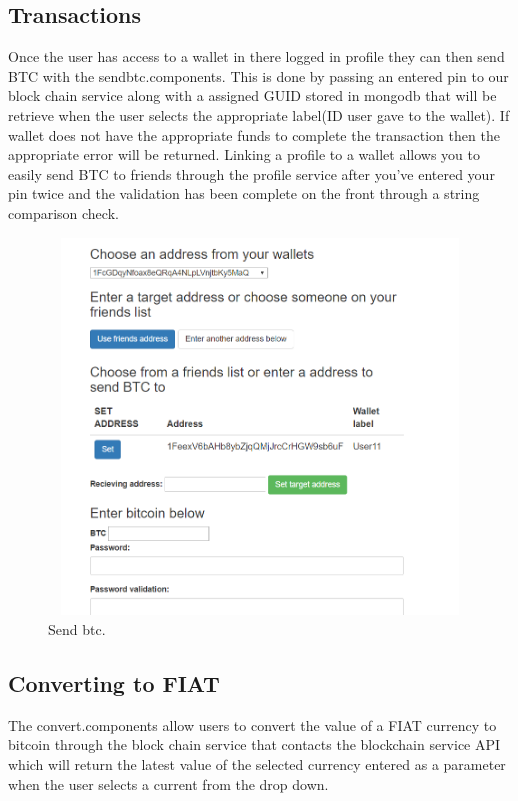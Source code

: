 \subsection{Transactions}
Once the user has access to a wallet in there logged in profile they can then send BTC with the sendbtc.components. This is done by passing an entered pin to our block chain service along with a assigned GUID stored in mongodb that will be retrieve when the user selects the appropriate label(ID user gave to the wallet). If wallet does not have the appropriate funds to complete the transaction then the appropriate error will be returned. Linking a profile to a wallet allows you to easily send BTC to friends through the profile service after you've entered your pin twice and the validation has been complete on the front through a string comparison check. 

\begin{figure}[H]
\centering
\includegraphics[width=16cm, height=10cm]{img/sendbtc.png}
\caption{Send btc.}
\end{figure}

\subsection{Converting to FIAT}
The convert.components allow users to convert the value of a FIAT currency to bitcoin through the block chain service that contacts the blockchain service API which will return the latest value of the selected currency entered as a parameter when the user selects a current from the drop down.

